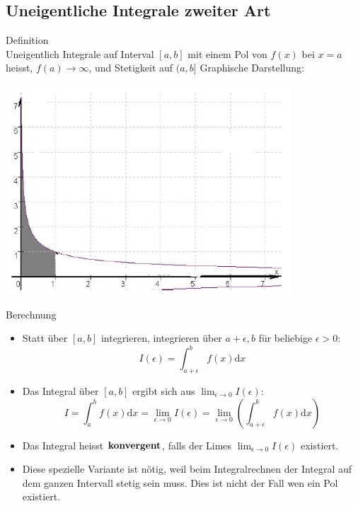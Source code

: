 \subsection{Uneigentliche Integrale zweiter Art}
	\begin{definition}{Definition}\\
		Uneigentlich Integrale auf Interval \([a,b]\) mit einem Pol von \(f(x)\) bei \(x=a\) heisst,
		\(f(a) \rightarrow \infty\), und Stetigkeit auf \((a,b]\)
		Graphische Darstellung:
	\begin{center}
		\includegraphics[width=0.8\textwidth]{images/Uneigentlicher_Integral_Beispiel2.png}
	\end{center}
  \end{definition}
  \begin{KR}{Berechnung}\\
	  \begin{itemize}
	  	
\item Statt über \([a,b]\) integrieren, integrieren über \(a+\epsilon,b\) für beliebige \(\epsilon>0\):
	\[I(\epsilon)=\int_{a+\epsilon}^b{f(x)\mathrm{d}x}\]
\item Das Integral über \([a,b]\) ergibt sich aus \(\lim_{\epsilon \rightarrow 0}I(\epsilon)\):
	\[I=\int_a^b{f(x)\mathrm{d}x}=\underset{\epsilon \rightarrow 0}{\lim}I(\epsilon)=\underset{\epsilon \rightarrow
	0}{\lim}\left(\int_{a+\epsilon}^b{f(x)\mathrm{d}x}\right) \]
\item Das Integral heisst \(\bold{konvergent}\), falls der Limes \(\lim_{\epsilon \rightarrow 0}I(\epsilon)\) existiert.
\item Diese spezielle Variante ist nötig, weil beim Integralrechnen der Integral auf dem ganzen Intervall stetig sein
	muss. Dies ist nicht der Fall wen ein Pol existiert.
\end{itemize}
  \end{KR}
